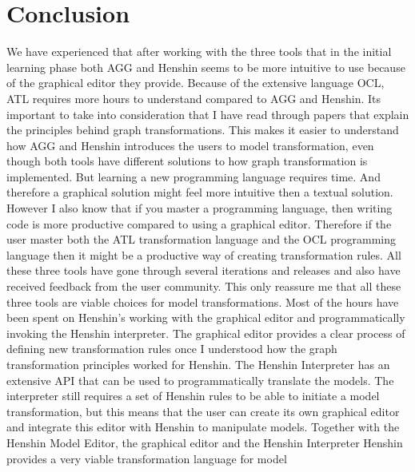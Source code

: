 \section{Conclusion}

We have experienced that after working with the three tools that in the initial
learning phase both AGG and Henshin seems to be more intuitive to use because of the
graphical editor they provide. Because of the extensive language OCL, ATL
requires more hours to understand compared to AGG and Henshin. Its important to
take into consideration that I have read through papers that explain the
principles behind graph transformations. This makes it easier to understand how
AGG and Henshin introduces the users to model transformation, even though both
tools have different solutions to how graph transformation is implemented. But
learning a new programming language requires time. And therefore a graphical
solution might feel more intuitive then a textual solution. However I also know
that if you master a programming language, then writing code is more productive
compared to using a graphical editor. Therefore if the user master both the ATL
transformation language and the OCL programming language then it might be a
productive way of creating transformation rules. All these three tools have gone
through several iterations and releases and also have received feedback from the
user community. This only reassure me that all these three tools are viable
choices for model transformations. Most of the hours have been spent on
Henshin's working with the graphical editor and programmatically
invoking the Henshin interpreter. The graphical editor provides a clear
process of defining new transformation rules once I understood how the graph
transformation principles worked for Henshin. The Henshin Interpreter has
an extensive API that can be used to programmatically translate the
models. The interpreter still requires a set of Henshin rules to be able to
initiate a model transformation, but this means that the user can create its own
graphical editor and integrate this editor with Henshin to manipulate models.
Together with the Henshin Model Editor, the graphical editor and the Henshin
Interpreter Henshin provides a very viable transformation language for model

